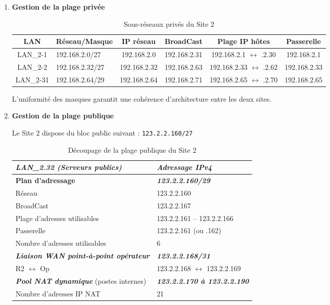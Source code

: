 \documentclass[12pt,a4paper, oneside]{memoir}
\begin{document}
\begin{enumerate}
	\item \textbf{Gestion de la plage privée}

\begin{table}[H]
	\centering
	\begin{tabular}{|c|l|c|c|c|c|}
		\hline
		\textbf{LAN} &  \textbf{Réseau/Masque}  & \textbf{IP réseau} & \textbf{BroadCast} & \textbf{Plage IP hôtes} & \textbf{Passerelle} \\
		\hline
		LAN\_2-1   & 192.168.2.0/27 &  192.168.2.0 & 192.168.2.31 & 192.168.2.1 $\leftrightarrow$ .2.30 & 192.168.2.1 \\
		LAN\_2-2   & 192.168.2.32/27 & 192.168.2.32 & 192.168.2.63 & 192.168.2.33 $\leftrightarrow$ .2.62 & 192.168.2.33 \\
		LAN\_2-31 & 192.168.2.64/29 &192.168.2.64 & 192.168.2.71 & 192.168.2.65 $\leftrightarrow$ .2.70& 192.168.2.65 \\
		\hline
	\end{tabular}
	\caption{Sous-réseaux privés du Site 2}
\end{table}

L’uniformité des masques garantit une cohérence d’architecture entre les deux sites.

\vspace{0.5cm}

\item \textbf{Gestion de la plage publique}

Le Site 2 dispose du bloc public suivant : \texttt{123.2.2.160/27}

\begin{table}[H]
	\centering
	\renewcommand{\arraystretch}{1.3}
	\begin{tabular}{|l|l|}
		\hline
		\rowcolor{gray!10}
		\textbf{\textit{LAN\_2.32 (Serveurs publics)}} & \textbf{\textit{Adressage IPv4}} \\
		\hline
		\textbf{Plan d'adressage} & \textbf{\textit{123.2.2.160/29}} \\
		\hline
		Réseau & 123.2.2.160 \\
		\hline
		BroadCast & 123.2.2.167\\
		\hline
		Plage d'adresses utilisables & 123.2.2.161 -- 123.2.2.166 \\
		\hline
		Passerelle & 123.2.2.161 (ou .162)\\
		\hline
		Nombre d'adresses utilisables & 6 \\
		\hline
		\hline
		\textbf{\textit{Liaison WAN point-à-point opérateur}} & \textbf{\textit{123.2.2.168/31}}\\
		\hline
		R2 $\leftrightarrow$ Op & 123.2.2.168 $\leftrightarrow$ 123.2.2.169\\
		\hline
		\hline
		\textbf{\textit{Pool NAT dynamique}} (postes internes) & \textbf{\textit{123.2.2.170 à 123.2.2.190}} \\
		\hline
		Nombre d'adresses IP NAT & 21 \\
		\hline
	\end{tabular}
	\caption{Découpage de la plage publique du Site 2}
\end{table}
\end{enumerate}
\end{document}
